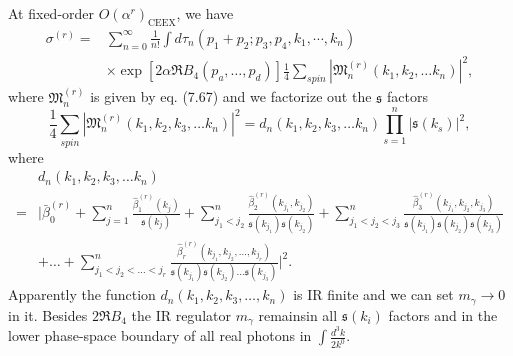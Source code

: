 At fixed-order $O(\alpha^r)_\text{CEEX}$, we have
\begin{align}
\sigma^{(r)}=&\sum_{n=0}^{\infty}\frac{1}{n!}\int d\tau_n(p_1+p_2;p_3,p_4,k_1,\cdots,k_n)\nonumber\\
&\times\exp[2\alpha\Re B_4(p_a,\ldots,p_d)]\frac{1}{4}\sum_{spin}\left| \mathfrak{M}^{(r)}_n(k_1,k_2,\ldots k_n) \right|^2,
\end{align}
where $\mathfrak{M}^{(r)}_n$ is given by eq. (7.67) and we factorize out the $\mathfrak{s}$ factors
\begin{equation}
\frac{1}{4}\sum_{spin}\left| \mathfrak{M}^{(r)}_n(k_1,k_2,k_3,\ldots k_n) \right|^2=d_n(k_1,k_2,k_3,\ldots k_n)\prod_{s=1}^{n}\left| \mathfrak{s}(k_s) \right|^2,
\end{equation}
where
\begin{align}
&d_n(k_1,k_2,k_3,\ldots k_n)\nonumber\\
=&\biggl| \bar{\beta}^{(r)}_0+\sum_{j=1}^{n}\frac{\hat{\beta}_1^{(r)}(k_j)}{\mathfrak{s}(k_j)}+\sum_{j_1<j_2}^{n}\frac{\hat{\beta}_2^{(r)}(k_{j_1},k_{j_2})}{\mathfrak{s}(k_{j_1})\mathfrak{s}(k_{j_2})}+\sum_{j_1<j_2<j_3}^{n}\frac{\hat{\beta}_3^{(r)}(k_{j_1},k_{j_2},k_{j_3})}{\mathfrak{s}(k_{j_1})\mathfrak{s}(k_{j_2})\mathfrak{s}(k_{j_3})}\nonumber\\
&+\ldots+\sum_{j_1<j_2<\ldots<j_r}^{n}\frac{\hat{\beta}_r^{(r)}(k_{j_1},k_{j_2},\ldots,k_{j_r})}{\mathfrak{s}(k_{j_1})\mathfrak{s}(k_{j_2})\ldots\mathfrak{s}(k_{j_3})} \biggr|^2.
\end{align}
Apparently the function $d_n(k_1,k_2,k_3,\ldots,k_n)$ is IR finite and we can set $m_\gamma\to 0$ in it. Besides $2\Re B_4$ the IR regulator $m_\gamma$ remainsin all $\mathfrak{s}(k_i)$ factors and in the lower phase-space boundary of all real photons in $\int\frac{d^3k}{2k^0}$. 

